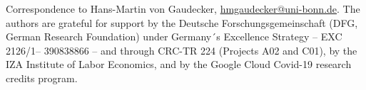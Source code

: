 Correspondence to Hans-Martin von Gaudecker,
\href{mailto:hmgaudecker@uni-bonn.de}{hmgaudecker@uni-bonn.de}. The authors are grateful
for support by the Deutsche Forschungsgemeinschaft (DFG, German Research Foundation)
under Germany´s Excellence Strategy – EXC 2126/1– 390838866 – and through CRC-TR 224
(Projects A02 and C01), by the IZA Institute of Labor Economics, and by the Google Cloud
Covid-19 research credits program.

